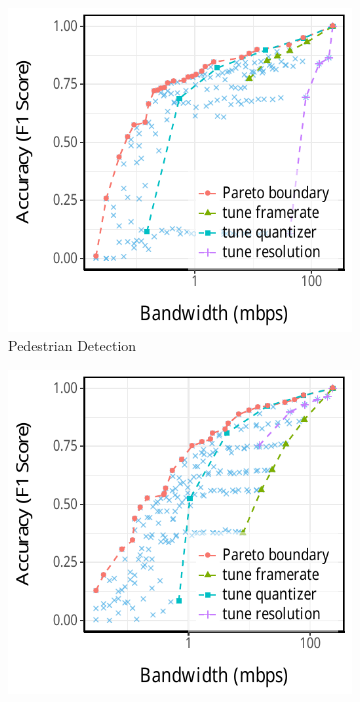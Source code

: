 \begin{figure}[htb]
  \centering
  \begin{subfigure}[t]{0.33\textwidth}
    \centering
    \includegraphics[width=\textwidth]{figures/profile-mot.pdf}
    \caption{Pedestrian Detection}
    \label{fig:pd-profile}
  \end{subfigure}
  \hfill
  \begin{subfigure}[t]{0.33\textwidth}
    \centering
    \includegraphics[width=\textwidth]{figures/profile-darknet.pdf}

\end{subfigure}
\end{figure}
